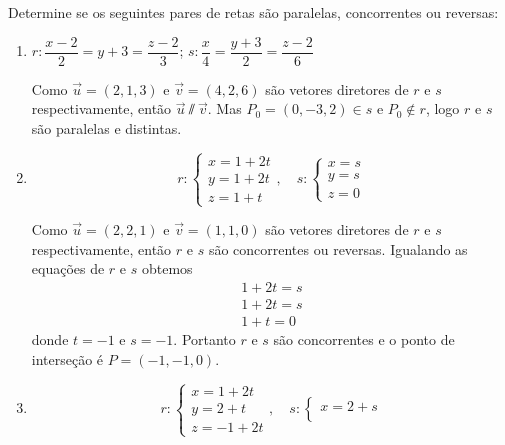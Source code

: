 \begin{exemplos}
    Determine se os seguintes pares de retas s\~ao paralelas, concorrentes ou reversas:
    \begin{enumerate}
        \item $r: \dfrac{x - 2}{2} = y + 3 = \dfrac{z - 2}{3}$; $s:\dfrac{x}{4} = \dfrac{y+3}{2} = \dfrac{z-2}{6}$
        \begin{solucao}
            Como $\vec{u} = (2,1,3)$ e $\vec{v} = (4,2,6)$ s\~ao vetores diretores de $r$ e $s$ respectivamente, ent\~ao $\vec{u}\varparallel\vec{v}$. Mas $P_0 = (0,-3,2)\in s$ e $P_0\notin r$, logo $r$ e $s$ s\~ao paralelas e distintas.
        \end{solucao}
        \item 
        \[
            r: \begin{cases}
                x = 1 + 2t\\
                y = 1 + 2t\\
                z = 1 + t
            \end{cases},\quad s: \begin{cases}
                x = s\\
                y = s\\
                z = 0
            \end{cases}
        \]
        \begin{solucao}
            Como $\vec{u} = (2,2,1)$ e $\vec{v} = (1,1,0)$ s\~ao vetores diretores de $r$ e $s$ respectivamente, ent\~ao $r$ e $s$ s\~ao concorrentes ou reversas. Igualando as equa\c{c}\~oes de $r$ e $s$ obtemos
            \begin{align*}
                1 + 2t = s\\
                1 + 2t = s\\
                1 + t = 0
            \end{align*}
            donde $t = -1$ e $s = -1$. Portanto $r$ e $s$ s\~ao concorrentes e o ponto de interse\c{c}\~ao \'e $P = (-1,-1,0)$.
        \end{solucao}
        \item
        \[
            r: \begin{cases}
                x = 1 + 2t\\
                y = 2 + t\\
                z = -1 + 2t
            \end{cases},\quad s: \begin{cases}
                x = 2 + s\\

\end{cases}\]
\end{enumerate}
\end{exemplos}

